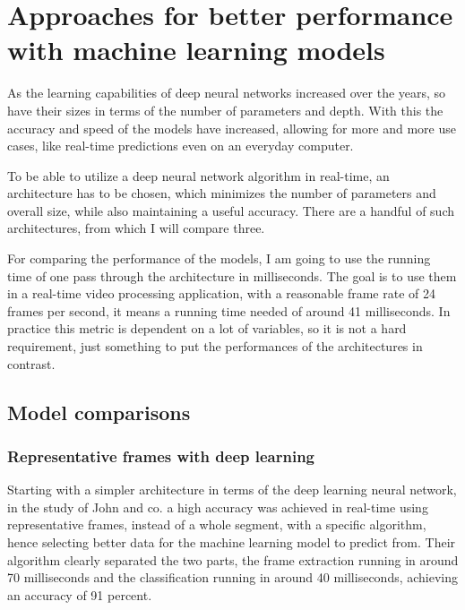 \chapter{Approaches for better performance with machine learning models}
\label{chap:preformance}

\par As the learning capabilities of deep neural networks increased over the years, so have their sizes in terms of the number of parameters and depth. With this the accuracy and speed of the models have increased, allowing for more and more use cases, like real-time predictions even on an everyday computer.
\par To be able to utilize a deep neural network algorithm in real-time, an architecture has to be chosen, which minimizes the number of parameters and overall size, while also maintaining a useful accuracy. There are a handful of such architectures, from which I will compare three.
\par For comparing the performance of the models, I am going to use the running time of one pass through the architecture in milliseconds. The goal is to use them in a real-time video processing application, with a reasonable frame rate of 24 frames per second, it means a running time needed of around 41 milliseconds. In practice this metric is dependent on a lot of variables, so it is not a hard requirement, just something to put the performances of the architectures in contrast.   

\section{Model comparisons}
\label{subsec:preformancesec1}

\subsection{Representative frames with deep learning}
\label{subsec:preformancesec1subsec1}

\par Starting with a simpler architecture in terms of the deep learning neural network, in the study of John and co. \cite{john2016} a high accuracy was achieved in real-time using representative frames, instead of a whole segment, with a specific algorithm, hence selecting better data for the machine learning model to predict from. Their algorithm clearly separated the two parts, the frame extraction running in  around 70 milliseconds and the classification running in around 40 milliseconds, achieving an accuracy of 91 percent.

